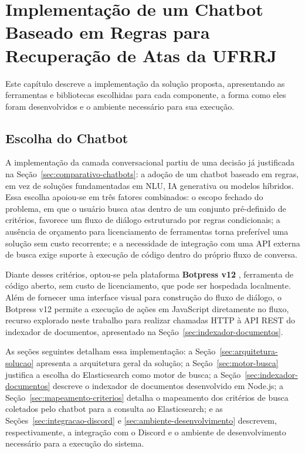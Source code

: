 \chapter{Implementação de um Chatbot Baseado em Regras para Recuperação de Atas da UFRRJ}\label{chp:EXPERIMENTOS}

Este capítulo descreve a implementação da solução proposta, apresentando as ferramentas e bibliotecas escolhidas para cada componente, a forma como eles foram desenvolvidos e o ambiente necessário para sua execução.

\section{Escolha do Chatbot}

A implementação da camada conversacional partiu de uma decisão já justificada na Seção~\ref{sec:comparativo-chatbots}: a adoção de um chatbot baseado em regras, em vez de soluções fundamentadas em NLU, IA generativa ou modelos híbridos. Essa escolha apoiou-se em três fatores combinados: o escopo fechado do problema, em que o usuário busca atas dentro de um conjunto pré-definido de critérios, favorece um fluxo de diálogo estruturado por regras condicionais; a ausência de orçamento para licenciamento de ferramentas torna preferível uma solução sem custo recorrente; e a necessidade de integração com uma API externa de busca exige suporte à execução de código dentro do próprio fluxo de conversa.

Diante desses critérios, optou-se pela plataforma \textbf{Botpress v12} \cite{botpress-about, botpress-docs}, ferramenta de código aberto, sem custo de licenciamento, que pode ser hospedada localmente. Além de fornecer uma interface visual para construção do fluxo de diálogo, o Botpress v12 permite a execução de ações em JavaScript diretamente no fluxo, recurso explorado neste trabalho para realizar chamadas HTTP à API REST do indexador de documentos, apresentado na Seção~\ref{sec:indexador-documentos}.

As seções seguintes detalham essa implementação: a Seção~\ref{sec:arquitetura-solucao} apresenta a arquitetura geral da solução; a Seção~\ref{sec:motor-busca} justifica a escolha do Elasticsearch como motor de busca; a Seção~\ref{sec:indexador-documentos} descreve o indexador de documentos desenvolvido em Node.js; a Seção~\ref{sec:mapeamento-criterios} detalha o mapeamento dos critérios de busca coletados pelo chatbot para a consulta ao Elasticsearch; e as Seções~\ref{sec:integracao-discord} e \ref{sec:ambiente-desenvolvimento} descrevem, respectivamente, a integração com o Discord e o ambiente de desenvolvimento necessário para a execução do sistema.

